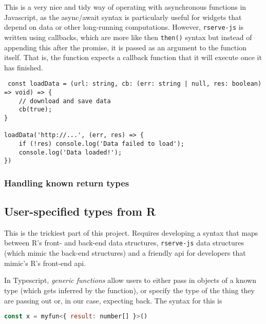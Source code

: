 \documentclass{article}
\newcommand{\pkg}[1]{\texttt{#1}}
\newcommand{\prog}[1]{{\sf #1}}
\newcommand{\proglang}[1]{\prog{#1}}
\newcommand{\R}{\prog{R}}
\begin{document}
This is a very nice and tidy way of operating with asynchronous functions in Javascript, as the async/await syntax is particularly useful for widgets that depend on data or other long-running computations.
However, \pkg{rserve-js} is written using callbacks, which are more like then \verb+then()+ syntax but instead of appending this after the promise, it is passed as an argument to the function itself.
That is, the function expects a callback function that it will execute once it has finished.
\begin{verbatim}
 const loadData = (url: string, cb: (err: string | null, res: boolean) => void) => {
    // download and save data
    cb(true);
}

loadData('http://...', (err, res) => {
    if (!res) console.log('Data failed to load');
    console.log('Data loaded!');
})
\end{verbatim}

\subsubsection{Handling known return types}
\label{sec:known-return}


\subsection{User-specified types from \proglang{R}}
\label{sec:user-types}

This is the trickiest part of this project.
Requires developing a syntax that maps between \R{}'s front- and back-end data structures, \pkg{rserve-js} data structures (which mimic the back-end structures) and a friendly \gls{api} for developers that mimic's \R{}'s front-end \gls{api}.

In Typescript, \emph{generic functions} allow users to either pass in objects of a known type (which gets inferred by the function), or specify the type of the thing they are passing out or, in our case, expecting back. The syntax for this is
\begin{lstlisting}[language=Javascript]
const x = myfun<{ result: number[] }>()
\end{lstlisting}
\end{document}
